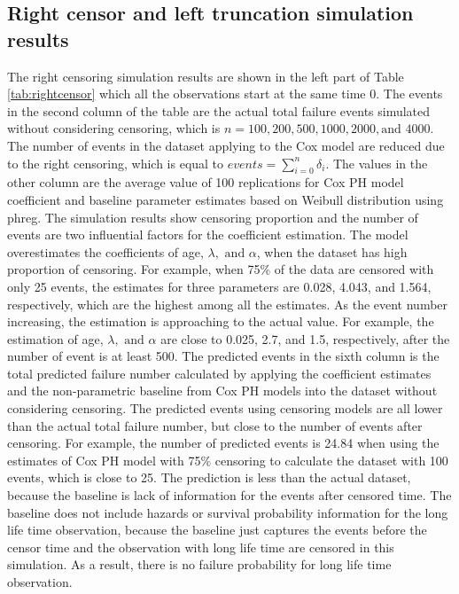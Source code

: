 \documentclass[12pt,letterpaper]{article}
\begin{document}
 \subsection{Right censor and left truncation simulation results}
 The right censoring simulation results are shown in the left part of Table \ref{tab:rightcensor} which all the observations start at the same time 0. The events in the second column of the table are the actual total failure events simulated without considering censoring, which is $n=100, 200, 500, 1000, 2000, \text{and } 4000$. The number of events in the dataset applying to the Cox model are reduced due to the right censoring, which is equal to $events=\sum_{i=0}^{n}{\delta_i}$. The values in the other column are the average value of 100 replications for Cox PH model coefficient and baseline parameter estimates based on Weibull distribution using phreg. The simulation results show censoring proportion and the number of events are two influential factors for the coefficient estimation. The model overestimates the coefficients of age, $\lambda, \text{ and } \alpha$, when the dataset has high proportion of censoring. For example, when 75\% of the data are censored with only 25 events, the estimates for three parameters are 0.028, 4.043, and 1.564, respectively, which are the highest among all the estimates. As the event number increasing, the estimation is approaching to the actual value. For example, the estimation of age, $\lambda, \text{ and } \alpha$ are close to 0.025, 2.7, and 1.5, respectively, after the number of event is at least 500.
 The predicted events in the sixth column is the total predicted failure number calculated by applying the coefficient estimates and the non-parametric baseline from Cox PH models into the dataset without considering censoring. The predicted events using censoring models are all lower than the actual total failure number, but close to the number of events after censoring. For example, the number of predicted events is 24.84 when using the estimates of Cox PH model with 75\% censoring to calculate the dataset with 100 events, which is close to 25. The prediction is less than the actual dataset, because the baseline is lack of information for the events after censored time. The baseline does not include hazards or survival probability information for the long life time observation, because the baseline just captures the events before the censor time and the observation with long life time are censored in this simulation. As a result, there is no failure probability for long life time observation.
\end{document}
